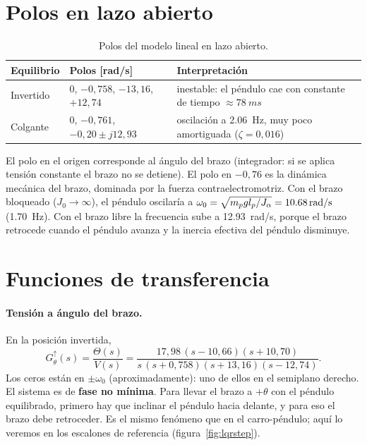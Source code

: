 \section{Polos en lazo abierto}

\begin{table}[H]
\centering\small
\begin{tabular}{@{}lll@{}}
\toprule
Equilibrio & Polos [rad/s] & Interpretación\\
\midrule
Invertido & $0$, $-0{,}758$, $-13{,}16$, $+12{,}74$ & inestable: el péndulo cae con constante de tiempo $\approx\SI{78}{ms}$\\
Colgante & $0$, $-0{,}761$, $-0{,}20\pm j12{,}93$ & oscilación a \SI{2.06}{Hz}, muy poco amortiguada ($\zeta=0{,}016$)\\
\bottomrule
\end{tabular}
\caption{Polos del modelo lineal en lazo abierto.}
\label{tab:polos}
\end{table}

El polo en el origen corresponde al ángulo del brazo (integrador: si se aplica tensión constante el brazo no se detiene). El polo en $-0{,}76$ es la dinámica mecánica del brazo, dominada por la fuerza contraelectromotriz. Con el brazo bloqueado ($J_0\to\infty$), el péndulo oscilaría a $\omega_0=\sqrt{m_pgl_p/J_\alpha}=\SI{10.68}{rad/s}$ (\SI{1.70}{Hz}). Con el brazo libre la frecuencia sube a \SI{12.93}{rad/s}, porque el brazo retrocede cuando el péndulo avanza y la inercia efectiva del péndulo disminuye.

\section{Funciones de transferencia}

\paragraph{Tensión a ángulo del brazo.} En la posición invertida,
\begin{equation}
  G_\theta^\uparrow(s)=\frac{\Theta(s)}{V(s)} = \frac{17{,}98\,(s-10{,}66)(s+10{,}70)}{s\,(s+0{,}758)(s+13{,}16)(s-12{,}74)} .
\end{equation}
Los ceros están en $\pm\omega_0$ (aproximadamente): uno de ellos en el semiplano derecho. El sistema es de \textbf{fase no mínima}. Para llevar el brazo a $+\theta$ con el péndulo equilibrado, primero hay que inclinar el péndulo hacia delante, y para eso el brazo debe retroceder. Es el mismo fenómeno que en el carro-péndulo; aquí lo veremos en los escalones de referencia (figura~\ref{fig:lqrstep}).

